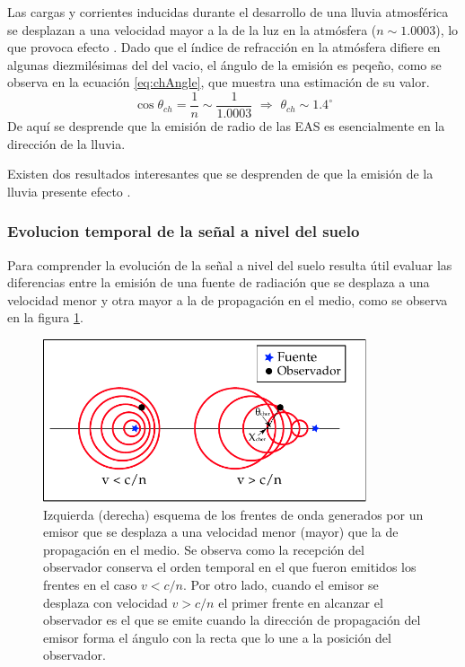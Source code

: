 	Las cargas y corrientes inducidas durante el desarrollo de una lluvia atmosf\'erica se desplazan a una velocidad mayor a la de la luz en la atm\'osfera ($n\sim1.0003$), lo que provoca efecto \cher{}.
	Dado que el \'indice de refracci\'on en la atm\'osfera difiere en algunas diezmil\'esimas del del vacio, el \'angulo \cher{} de la emisi\'on es peqe\~no, como se observa en la ecuación \ref{eq:chAngle}, que muestra una estimación de su valor.
	\begin{equation}
	\cos\theta_{ch} = \frac{1}{n} \sim \frac{1}{1.0003}
	\,\, \Rightarrow \,\,
	\theta_{ch} \sim 1.4^\circ
	\label{eq:chAngle}
	\end{equation}
	De aqu\'i se desprende que la emisi\'on de radio de las EAS es esencialmente en la direcci\'on de la lluvia.
	
	Existen dos resultados interesantes que se desprenden de que la emisi\'on de la lluvia presente efecto \cher{}.
	
	\subsubsection{Evolucion temporal de la se\~nal a nivel del suelo}
	
	Para comprender la evoluci\'on de la se\~nal a nivel del suelo resulta \'util evaluar las diferencias entre la emisi\'on de una fuente de radiaci\'on que se desplaza a una velocidad menor y otra mayor a la de propagaci\'on en el medio, como se observa en la figura \ref{fig:cher_emision_1}.
	\begin{figure}[ht!]
		\centering
		\includegraphics[width=0.85\textwidth]{fig/EASRadio/cherEmmision}
		\caption{\label{fig:cher_emision_1} Izquierda (derecha) esquema de los frentes de onda generados por un emisor que se desplaza a una velocidad menor (mayor) que la de propagaci\'on en el medio. Se observa como la recepci\'on del observador conserva el orden temporal en el que fueron emitidos los frentes en el caso $v<c/n$. Por otro lado, cuando el emisor se desplaza con velocidad $v>c/n$ el primer frente en alcanzar el observador es el que se emite cuando la direcci\'on de propagaci\'on del emisor forma el \'angulo \cher{} con la recta que lo une a la posici\'on del observador.}
	\end{figure}
	
